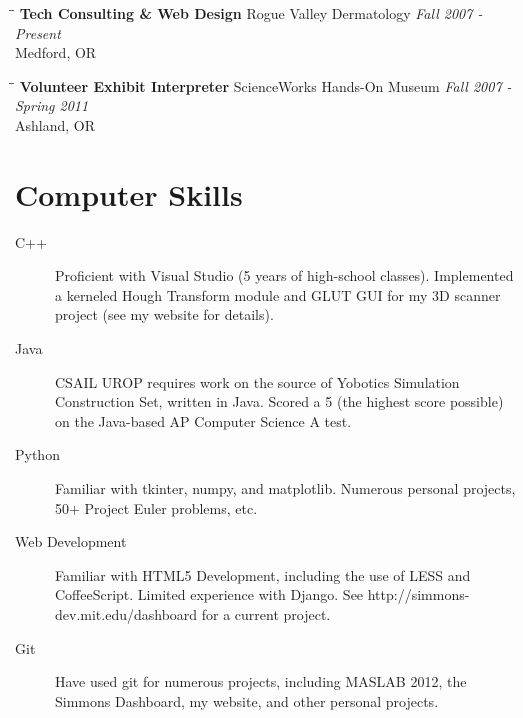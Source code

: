 \documentclass{res}
\begin{document}
\begin{resume}
			\begin{tabbing}%
				\hspace{2.3in}\= \hspace{2.6in}\= \kill %
				{\bf Tech Consulting \& Web Design}	\>Rogue Valley Dermatology	\> \textit{Fall 2007 - Present}\\
													\>Medford, OR
			\end{tabbing}\vspace{-20pt}

			\begin{tabbing}%
				\hspace{2.3in}\= \hspace{2.6in}\= \kill %
				{\bf Volunteer Exhibit Interpreter}	\>ScienceWorks Hands-On Museum	\> \textit{Fall 2007 - Spring 2011}\\
													\>Ashland, OR
			\end{tabbing}

		\vspace{-20pt}
		\section{Computer Skills}

			\begin{description}

				\item[C++] Proficient with Visual Studio (5 years of high-school classes). Implemented a kerneled Hough Transform module  and GLUT GUI for my 3D scanner project (see my website for details).

				\item[Java] CSAIL UROP requires work on the source of Yobotics Simulation Construction Set, written in Java. Scored a 5 (the highest score possible) on the Java-based AP Computer Science A test.

				\item[Python] Familiar with tkinter, numpy, and matplotlib. Numerous personal projects, 50+ Project Euler problems, etc.

				\item[Web Development] Familiar with HTML5 Development, including the use of LESS and CoffeeScript. Limited experience with Django. See http://simmons-dev.mit.edu/dashboard for a current project.

				\item[Git] Have used git for numerous projects, including MASLAB 2012, the Simmons Dashboard, my website, and other personal projects.


\end{description}
\end{resume}
\end{document}
